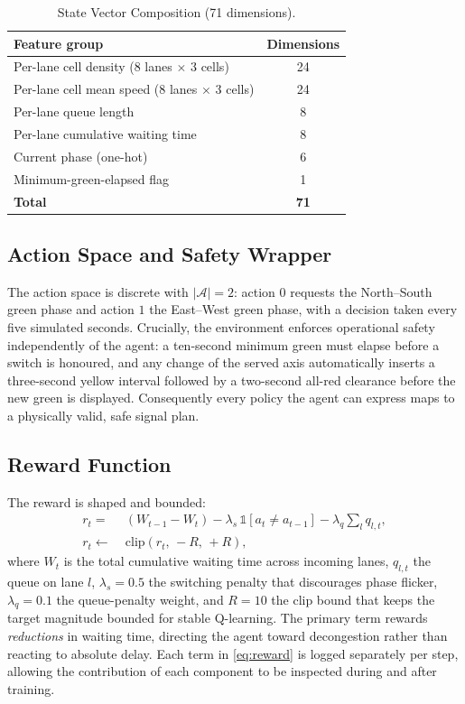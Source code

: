 \documentclass[conference]{IEEEtran}
\begin{document}
\begin{table}[t]
\caption{State Vector Composition (71 dimensions).}
\label{tab:state}
\centering
\begin{tabular}{@{}lc@{}}
\toprule
Feature group & Dimensions \\
\midrule
Per-lane cell density (8 lanes $\times$ 3 cells) & 24 \\
Per-lane cell mean speed (8 lanes $\times$ 3 cells) & 24 \\
Per-lane queue length & 8 \\
Per-lane cumulative waiting time & 8 \\
Current phase (one-hot) & 6 \\
Minimum-green-elapsed flag & 1 \\
\midrule
\textbf{Total} & \textbf{71} \\
\bottomrule
\end{tabular}
\end{table}

\subsection{Action Space and Safety Wrapper}
The action space is discrete with $|\mathcal{A}|=2$: action $0$ requests the
North--South green phase and action $1$ the East--West green phase, with a
decision taken every five simulated seconds. Crucially, the environment enforces
operational safety independently of the agent: a ten-second minimum green must
elapse before a switch is honoured, and any change of the served axis
automatically inserts a three-second yellow interval followed by a two-second
all-red clearance before the new green is displayed. Consequently every policy
the agent can express maps to a physically valid, safe signal plan.

\subsection{Reward Function}
The reward is shaped and bounded:
\begin{equation}
\begin{aligned}
r_t = &\;(W_{t-1} - W_t)
      - \lambda_s\,\mathbb{1}[a_t \neq a_{t-1}]
      - \lambda_q \sum_{l} q_{l,t}, \\
r_t \leftarrow &\; \mathrm{clip}(r_t,\,-R,\,+R),
\end{aligned}
\label{eq:reward}
\end{equation}
where $W_t$ is the total cumulative waiting time across incoming lanes,
$q_{l,t}$ the queue on lane $l$, $\lambda_s=0.5$ the switching penalty that
discourages phase flicker, $\lambda_q=0.1$ the queue-penalty weight, and $R=10$
the clip bound that keeps the target magnitude bounded for stable Q-learning.
The primary term rewards \emph{reductions} in waiting time, directing the agent
toward decongestion rather than reacting to absolute delay. Each term in
\eqref{eq:reward} is logged separately per step, allowing the contribution of
each component to be inspected during and after training.
\end{document}

